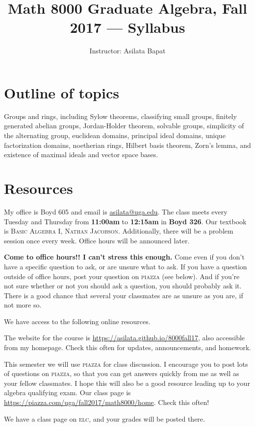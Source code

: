 \documentclass[letterpaper,10pt]{amsart}
\title{Math 8000 Graduate Algebra, Fall 2017 --- Syllabus}
\author{Instructor: Asilata Bapat}
\newcommand{\resource}{\textsc}
\begin{document}
\maketitle

\section{Outline of topics}
Groups and rings, including Sylow theorems, classifying small groups, finitely generated abelian groups, Jordan-Holder theorem, solvable groups, simplicity of the alternating group, euclidean domains, principal ideal domains, unique factorization domains, noetherian rings, Hilbert basis theorem, Zorn's lemma, and existence of maximal ideals and vector space bases.

\section{Resources}
My office is Boyd 605 and email is \url{asilata@uga.edu}.
The class meets every Tuesday and Thursday from \textbf{11:00am} to \textbf{12:15am} in \textbf{Boyd 326}.
Our textbook is \resource{Basic Algebra I, Nathan Jacobson}.
Additionally, there will be a problem session once every week.
Office hours will be announced later.

\textbf{Come to office hours!! I can't stress this enough.}
Come even if you don't have a specific question to ask, or are unsure what to ask.
If you have a question outside of office hours, post your question on \resource{piazza} (see below).
And if you're not sure whether or not you should ask a question, you should probably ask it.
There is a good chance that several your classmates are as unsure as you are, if not more so.

We have access to the following online resources.
\begin{compactenum}[(1)]
\item The website for the course is \url{https://asilata.github.io/8000fall17}, also accessible from my homepage.
  Check this often for updates, announcements, and homework.
\item This semester we will use \resource{piazza} for class discussion.
  I encourage you to post lots of questions on \resource{piazza}, so that you can get answers quickly from me as well as your fellow classmates.
  I hope this will also be a good resource leading up to your algebra qualifying exam.
  Our class page is \url{https://piazza.com/uga/fall2017/math8000/home}. 
  Check this often!
\item We have a class page on \resource{elc}, and your grades will be posted there.
\end{compactenum}
\end{document}
